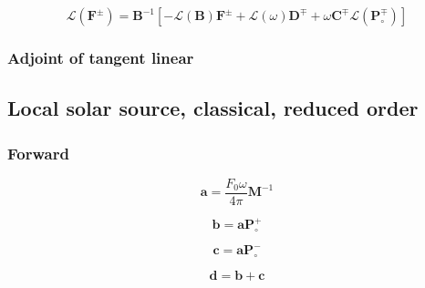 \begin{equation}
\mathcal{L}(\mathbf{F}^{\pm}) = \mathbf{B}^{-1}\left[-\mathcal{L}(\mathbf{B}) \mathbf{F}^{\pm} + \mathcal{L}(\omega)\mathbf{D}^{\mp} + \omega\mathbf{C}^{\mp}\mathcal{L}(\mathbf{P}^{\mp}_{\circ})\right]
\label{eq:solar_source-local_solar_source-classical_full_order-tangent_linear-G}
\end{equation}


%
\subsubsection{Adjoint of tangent linear}
\label{sec:solar_source-local_solar_source-classical_full_order-adjoint_of_tangent_linear}


%
\subsection{Local solar source, classical, reduced order}
\label{sec:solar_source-local_solar_source-classical_reduced_order}


\subsubsection{Forward}
\label{sec:solar_source-local_solar_source-classical_reduced_order-forward}


\begin{equation}
\mathbf{a} = \frac{F_{0}\omega}{4\pi} \mathbf{M}^{-1}
\label{eq:solar_source-local_solar_source-classical_reduced_order-forward-a}
\end{equation}

\begin{equation}
\mathbf{b} = \mathbf{a}\mathbf{P}^{+}_{\circ}
\label{eq:solar_source-local_solar_source-classical_reduced_order-forward-b}
\end{equation}

\begin{equation}
\mathbf{c} = \mathbf{a}\mathbf{P}^{-}_{\circ}
\label{eq:solar_source-local_solar_source-classical_reduced_order-forward-c}
\end{equation}

\begin{equation}
\mathbf{d} = \mathbf{b} + \mathbf{c}
\label{eq:solar_source-local_solar_source-classical_reduced_order-forward-d}
\end{equation}

